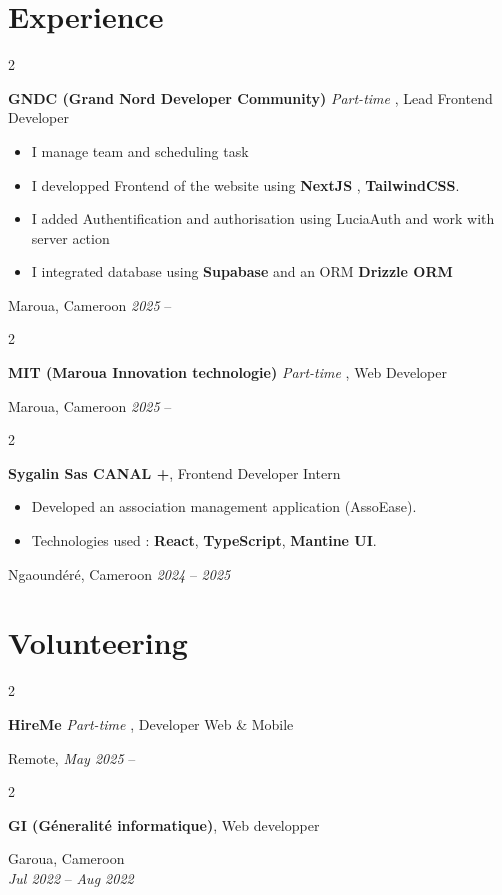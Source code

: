 \documentclass[10pt, letterpaper]{article}
\newenvironment{highlights}{
	\begin{itemize}[
		topsep=0.10 cm,
		parsep=0.10 cm,
		partopsep=0pt,
		itemsep=0pt,
		leftmargin=0.4 cm + 10pt
		]
	}{
	\end{itemize}
} %
\newenvironment{twocolentry}[2][]{
	\onecolentry
	\def\secondColumn{#2}
	\setcolumnwidth{\fill, 4.5 cm} %
	\begin{paracol}{2}
	}{
		\switchcolumn \raggedleft \secondColumn
	\end{paracol}
	\endonecolentry
} %
\begin{document}
	\section{Experience}
	\begin{twocolentry}{Maroua, Cameroon \textit{2025} – }
		\textbf{GNDC (Grand Nord Developer Community)} \textit{Part-time} , Lead Frontend Developer
		\begin{highlights}
			\item I manage team and scheduling task
			\item I developped Frontend of the website using \textbf{NextJS} , \textbf{TailwindCSS}.
			\item I added Authentification and authorisation using LuciaAuth and work with server action
			\item I integrated database using \textbf{Supabase} and an ORM \textbf{Drizzle ORM}
		\end{highlights}
	\end{twocolentry}
	\begin{twocolentry}{Maroua, Cameroon \textit{2025} – }
		\textbf{MIT (Maroua Innovation technologie)} \textit{Part-time} , Web Developer
	\end{twocolentry}
	\vspace{0.2 cm}
	\begin{twocolentry}{Ngaoundéré, Cameroon \textit{2024} – \textit{2025}}
		\textbf{Sygalin Sas CANAL +}, Frontend Developer Intern
		\begin{highlights}
			\item Developed an association management application (AssoEase).
			\item Technologies used : \textbf{React}, \textbf{TypeScript}, \textbf{Mantine UI}.
		\end{highlights}
	\end{twocolentry}
	\section{Volunteering}
	\begin{twocolentry}{Remote, \textit{May 2025} – }
		\textbf{HireMe} \textit{Part-time} , Developer Web \& Mobile
	\end{twocolentry}
	\vspace{0.2 cm}
	\begin{twocolentry}{Garoua, Cameroon\\ \textit{Jul 2022} – \textit{Aug 2022}}
		\textbf{GI (Géneralité informatique)}, Web developper
	\end{twocolentry}
\end{document}
